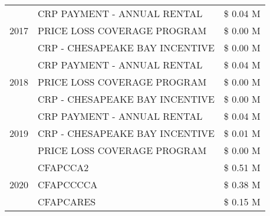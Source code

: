 \begin{tabular}{llr}
\cline{1-3}
\multirow[t]{3}{*}{2017} & CRP PAYMENT - ANNUAL RENTAL & \$ 0.04 M \\
 & PRICE LOSS COVERAGE PROGRAM & \$ 0.00 M \\
 & CRP - CHESAPEAKE BAY INCENTIVE & \$ 0.00 M \\
\cline{1-3}
\multirow[t]{3}{*}{2018} & CRP PAYMENT - ANNUAL RENTAL & \$ 0.04 M \\
 & PRICE LOSS COVERAGE PROGRAM & \$ 0.00 M \\
 & CRP - CHESAPEAKE BAY INCENTIVE & \$ 0.00 M \\
\cline{1-3}
\multirow[t]{3}{*}{2019} & CRP PAYMENT - ANNUAL RENTAL & \$ 0.04 M \\
 & CRP - CHESAPEAKE BAY INCENTIVE & \$ 0.01 M \\
 & PRICE LOSS COVERAGE PROGRAM & \$ 0.00 M \\
\cline{1-3}
\multirow[t]{3}{*}{2020} & CFAPCCA2 & \$ 0.51 M \\
 & CFAPCCCCA & \$ 0.38 M \\
 & CFAPCARES & \$ 0.15 M \\
\cline{1-3}
\bottomrule
\end{tabular}
